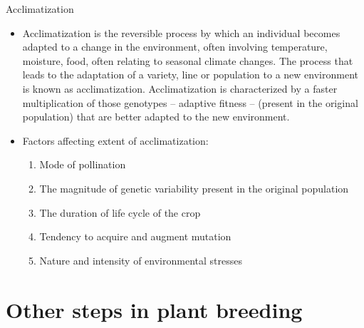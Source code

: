 \documentclass[11pt,ignorenonframetext,aspectratio=169]{beamer}
\providecommand{\tightlist}{%
  \setlength{\itemsep}{0pt}\setlength{\parskip}{0pt}}
\begin{document}
\begin{frame}{Acclimatization}
\protect\hypertarget{acclimatization}{}
\begin{itemize}
\item
  Acclimatization is the reversible process by which an individual
  becomes adapted to a change in the environment, often involving
  temperature, moisture, food, often relating to seasonal climate
  changes. The process that leads to the adaptation of a variety, line
  or population to a new environment is known as acclimatization.
  Acclimatization is characterized by a faster multiplication of those
  genotypes -- adaptive fitness -- (present in the original population)
  that are better adapted to the new environment.
\item
  Factors affecting extent of acclimatization:

  \begin{enumerate}
  \tightlist
  \item
    Mode of pollination
  \item
    The magnitude of genetic variability present in the original
    population
  \item
    The duration of life cycle of the crop
  \item
    Tendency to acquire and augment mutation
  \item
    Nature and intensity of environmental stresses
  \end{enumerate}
\end{itemize}
\end{frame}

\hypertarget{other-steps-in-plant-breeding}{%
\section{Other steps in plant
breeding}\label{other-steps-in-plant-breeding}}
\end{document}
